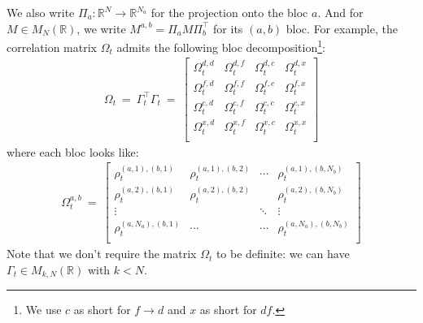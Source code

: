 \documentclass[11pt,english]{amsart}
\newcommand{\RR}{\mathbb{R}}
\theoremstyle{definition}
\begin{document}
We also write $\Pi_a: \RR^N \to \RR^{N_a}$ for the projection onto the bloc $a$. And for $M \in M_{N}(\RR)$, we write $M^{a,b} = \Pi_a M \Pi_b^{\top}$ for its $(a,b)$ bloc. For example, the correlation matrix $\Omega_t$ admits the following bloc decomposition\footnote{We use $c$ as short for $f\to d$ and $x$ as short for $df$.}:
\begin{eqnarray}
  \Omega_t ~=~ \Gamma_{t}^\top\Gamma_t ~=~
  \begin{bmatrix}
     \Omega^{d,d}_{t} &   \Omega^{d,f}_{t}  &  \Omega^{d,c}_{t}  &  \Omega^{d,x}_{t}  \\
     \Omega^{f,d}_{t} &   \Omega^{f,f}_{t}  &  \Omega^{f,c}_{t}  & \Omega^{f,x}_{t}  \\
     \Omega^{c,d}_{t} &   \Omega^{c,f}_{t}  &  \Omega^{c,c}_{t}  &  \Omega^{c,x}_{t}  \\
     \Omega^{x,d}_{t} &  \Omega^{x,f}_{t}  &  \Omega^{x,c}_{t}  &  \Omega^{x,x}_{t}  \\
      \end{bmatrix}
\end{eqnarray}
where each bloc looks like:
\begin{eqnarray}
  \Omega^{a,b}_t ~=~
  \begin{bmatrix}
     \rho^{(a,1),(b,1)}_{t} &   \rho^{(a,1),(b,2)}_{t}   &  \cdots &  \rho^{(a,1),(b,N_b)}_{t}  \\
     \rho^{(a,2),(b,1)}_{t}  &   \rho^{(a,2),(b,2)}_{t}   &   & \rho^{(a,2),(b,N_b)}_{t}   \\
     \vdots &     &  \ddots  &  \vdots  \\
     \rho^{(a,N_a),(b,1)}_{t}  &  \cdots  &  \cdots  &  \rho^{(a,N_a),(b,N_b)}_{t}  \\
      \end{bmatrix}
\end{eqnarray}
Note that we don't require the matrix $\Omega_t$ to be definite: we can have $\Gamma_t \in M_{k,N}(\RR)$ with $k< N$.
\end{document}
